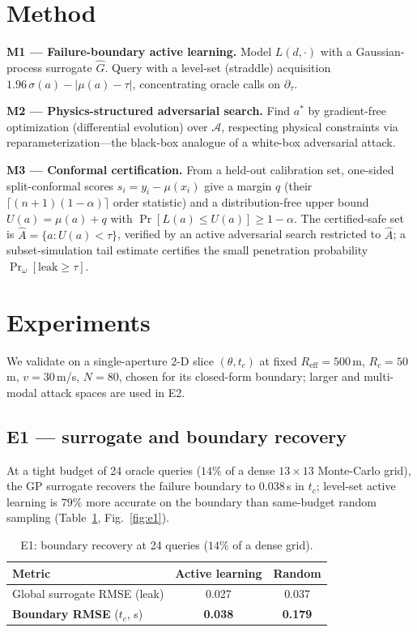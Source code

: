 \documentclass[11pt]{article}
\begin{document}
\section{Method}\label{sec:method}
\textbf{M1 --- Failure-boundary active learning.} Model $L(d,\cdot)$ with a Gaussian-process
surrogate $\hat G$. Query with a level-set (straddle) acquisition
$1.96\,\sigma(a)-|\mu(a)-\tau|$, concentrating oracle calls on $\partial_\tau$.

\textbf{M2 --- Physics-structured adversarial search.} Find $a^\ast$ by gradient-free
optimization (differential evolution) over $\mathcal A$, respecting physical constraints via
reparameterization---the black-box analogue of a white-box adversarial attack.

\textbf{M3 --- Conformal certification.} From a held-out calibration set, one-sided
split-conformal scores $s_i=y_i-\mu(x_i)$ give a margin $q$ (their
$\lceil(n{+}1)(1-\alpha)\rceil$ order statistic) and a distribution-free upper bound
$U(a)=\mu(a)+q$ with $\Pr[L(a)\le U(a)]\ge1-\alpha$. The certified-safe set is
$\hat A=\{a:U(a)<\tau\}$, verified by an active adversarial search restricted to $\hat A$; a
subset-simulation tail estimate certifies the small penetration probability
$\Pr_\omega[\text{leak}\ge\tau]$.

\section{Experiments}\label{sec:experiments}
We validate on a single-aperture 2-D slice $(\theta,t_c)$ at fixed $R_{\text{eff}}=500$\,m,
$R_c=50$\,m, $v=30$\,m/s, $N=80$, chosen for its closed-form boundary; larger and multi-modal
attack spaces are used in E2.

\subsection{E1 --- surrogate and boundary recovery}
At a tight budget of 24 oracle queries ($14\%$ of a dense $13\times13$ Monte-Carlo grid), the
GP surrogate recovers the failure boundary to $0.038$\,s in $t_c$; level-set active learning is
$79\%$ more accurate on the boundary than same-budget random sampling
(Table~\ref{tab:e1}, Fig.~\ref{fig:e1}).

\begin{table}[h]
\centering
\caption{E1: boundary recovery at 24 queries ($14\%$ of a dense grid).}
\label{tab:e1}
\begin{tabular}{lcc}
\toprule
Metric & Active learning & Random \\
\midrule
Global surrogate RMSE (leak) & 0.027 & 0.037 \\
\textbf{Boundary RMSE} ($t_c$, s) & \textbf{0.038} & \textbf{0.179} \\
\bottomrule
\end{tabular}
\end{table}
\end{document}
